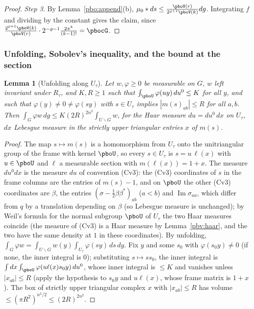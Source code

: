 \documentclass[10pt]{amsart}
\newtheorem{lemma}[theorem]{Lemma}
\theoremstyle{definition}
\theoremstyle{remark}
\newcommand{\Iml}{\operatorname{Im}}
\begin{document}
\begin{proof}
\emph{Step 3.} By Lemma~\ref{pbo:append}(b), $\mu_0*ds\le\frac{\pboV(r)}{2^{\varrho+1}\pboV(k)}dg$.
Integrating $f$ and dividing by the constant gives the claim, since $\frac{2^{\varrho+1}\pboV(k)}{\pboV(r)}
\cdot2^{-\varrho-1}\frac{2\pi^k}{(k-1)!}=\pbocG$.
\end{proof}

\subsubsection{Unfolding, Sobolev's inequality, and the bound at the section}\label{pbo:ss-sobolev}

\begin{lemma}[Unfolding along $U_\tau$]\label{pbo:unfold}
Let $w,\varphi\ge0$ be measurable on $G$, $w$ left invariant under $R_\tau$, and $K,R\ge1$ such that
$\int_{\pboU}\varphi(uy)\,du^0\le K$ for all $y$, and such that $\varphi(y)\ne0\ne\varphi(sy)$ with $s\in U_\tau$
implies $|m(s)_{ab}|\le R$ for all $a,b$. Then $\int_G\varphi w\,dg\le K(2R)^{2n^2}\int_{U\backslash G}w$,
for the Haar measure $du=du^0\,dx$ on $U_\tau$, $dx$ Lebesgue measure in the strictly upper triangular
entries $x$ of $m(s)$.
\end{lemma}
\begin{proof}
The map $s\mapsto m(s)$ is a homomorphism from $U_\tau$ onto the unitriangular group of the frame with
kernel $\pboU$, so every $s\in U_\tau$ is $s=u\,\ell(x)$ with $u\in\pboU$ and $\ell$ a measurable section
with $m(\ell(x))=1+x$. The measure $du^0dx$ is the measure $du$ of convention \textup{(Cv3)}: the
\textup{(Cv3)} coordinates of $s$ in the frame columns are the entries of $m(s)-1$, and on $\pboU$ the
other \textup{(Cv3)} coordinates are $\beta$, the entries $(\sigma-\frac12\beta\beta^*)_{ab}$ ($a<b$) and
$\Iml\sigma_{aa}$, which differ from $q$ by a translation depending on $\beta$ (so Lebesgue measure is
unchanged); by Weil's formula for the normal subgroup $\pboU$ of $U_\tau$ the two Haar measures
coincide (the measure of (Cv3) is a Haar measure by Lemma~\ref{pbv:haar}, and the two have the same
density at $1$ in these coordinates). By unfolding, $\int_G\varphi w=\int_{U\backslash G}w(y)\int_{U_\tau}\varphi(sy)\,ds\,dy$.
Fix $y$ and some $s_0$ with $\varphi(s_0y)\ne0$ (if none, the inner integral is $0$); substituting $s\mapsto
ss_0$, the inner integral is $\int dx\int_{\pboU}\varphi(u\ell(x)s_0y)\,du^0$, whose inner integral is $\le K$
and vanishes unless $|x_{ab}|\le R$ (apply the hypothesis to $s_0y$ and $u\ell(x)$, whose frame matrix is
$1+x$). The box of strictly upper triangular complex $x$ with $|x_{ab}|\le R$ has volume $\le(\pi R^2)^{
n^2/2}\le(2R)^{2n^2}$.
\end{proof}
\end{document}

